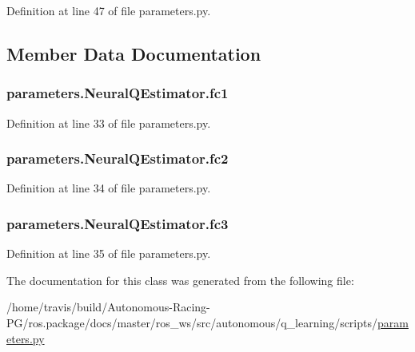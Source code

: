 Definition at line 47 of file parameters.\+py.



\subsection{Member Data Documentation}
\subsubsection[{\texorpdfstring{fc1}{fc1}}]{\setlength{\rightskip}{0pt plus 5cm}parameters.\+Neural\+Q\+Estimator.\+fc1}\hypertarget{classparameters_1_1_neural_q_estimator_ab0fb7d0e286565a2531f3ddb126e2592}{}\label{classparameters_1_1_neural_q_estimator_ab0fb7d0e286565a2531f3ddb126e2592}


Definition at line 33 of file parameters.\+py.

\subsubsection[{\texorpdfstring{fc2}{fc2}}]{\setlength{\rightskip}{0pt plus 5cm}parameters.\+Neural\+Q\+Estimator.\+fc2}\hypertarget{classparameters_1_1_neural_q_estimator_abd606711b39f423590adacb37c5b55d0}{}\label{classparameters_1_1_neural_q_estimator_abd606711b39f423590adacb37c5b55d0}


Definition at line 34 of file parameters.\+py.

\subsubsection[{\texorpdfstring{fc3}{fc3}}]{\setlength{\rightskip}{0pt plus 5cm}parameters.\+Neural\+Q\+Estimator.\+fc3}\hypertarget{classparameters_1_1_neural_q_estimator_ac48aa201a71a0e25e8ca7274a2cc5733}{}\label{classparameters_1_1_neural_q_estimator_ac48aa201a71a0e25e8ca7274a2cc5733}


Definition at line 35 of file parameters.\+py.



The documentation for this class was generated from the following file\+:\begin{DoxyCompactItemize}
\item 
/home/travis/build/\+Autonomous-\/\+Racing-\/\+P\+G/ros.\+package/docs/master/ros\+\_\+ws/src/autonomous/q\+\_\+learning/scripts/\hyperlink{parameters_8py}{parameters.\+py}\end{DoxyCompactItemize}
